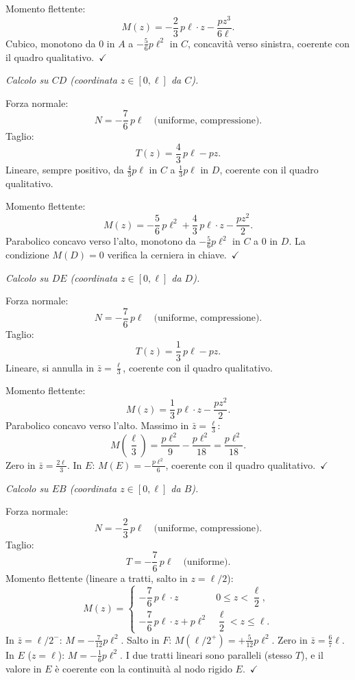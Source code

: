 \noindent Momento flettente:
\[
M(z) = -\frac{2}{3}\,p\ell\cdot z - \frac{pz^3}{6\ell}.
\]
Cubico, monotono da $0$ in $A$ a $-\tfrac{5}{6}p\ell^2$
in $C$, concavità verso sinistra, coerente con il quadro qualitativo.~$\checkmark$

\medskip
\noindent\textit{Calcolo su $CD$
(coordinata $z \in [0,\ell]$ da $C$).}

\noindent Forza normale:
\[
N = -\frac{7}{6}\,p\ell
\quad\text{(uniforme, compressione).}
\]
Taglio:
\[
T(z) = \frac{4}{3}\,p\ell - pz.
\]
Lineare, sempre positivo, da $\tfrac{4}{3}p\ell$
in $C$ a $\tfrac{1}{3}p\ell$ in $D$,
coerente con il quadro qualitativo.

\noindent Momento flettente:
\[
M(z) = -\frac{5}{6}\,p\ell^2
+ \frac{4}{3}\,p\ell\cdot z - \frac{pz^2}{2}.
\]
Parabolico concavo verso l'alto, monotono da
$-\tfrac{5}{6}p\ell^2$ in $C$ a $0$ in $D$.
La condizione $M(D)=0$ verifica la cerniera
in chiave.~$\checkmark$

\medskip
\noindent\textit{Calcolo su $DE$
(coordinata $z \in [0,\ell]$ da $D$).}

\noindent Forza normale:
\[
N = -\frac{7}{6}\,p\ell
\quad\text{(uniforme, compressione).}
\]
Taglio:
\[
T(z) = \frac{1}{3}\,p\ell - pz.
\]
Lineare, si annulla in $\bar{z} = \tfrac{\ell}{3}$,
coerente con il quadro qualitativo.

\noindent Momento flettente:
\[
M(z) = \frac{1}{3}\,p\ell\cdot z - \frac{pz^2}{2}.
\]
Parabolico concavo verso l'alto.
Massimo in $\bar{z} = \tfrac{\ell}{3}$:
\[
M\!\left(\frac{\ell}{3}\right)
= \frac{p\ell^2}{9} - \frac{p\ell^2}{18}
= \frac{p\ell^2}{18}.
\]
Zero in $\bar{z} = \tfrac{2\ell}{3}$.
In $E$: $M(E) = -\tfrac{p\ell^2}{6}$,
coerente con il quadro qualitativo.~$\checkmark$

\medskip
\noindent\textit{Calcolo su $EB$
(coordinata $z \in [0,\ell]$ da $B$).}

\noindent Forza normale:
\[
N = -\frac{2}{3}\,p\ell
\quad\text{(uniforme, compressione).}
\]
Taglio:
\[
T = -\frac{7}{6}\,p\ell
\quad\text{(uniforme).}
\]
Momento flettente (lineare a tratti, salto in
$z = \ell/2$):
\[
M(z) = \begin{cases}
-\dfrac{7}{6}\,p\ell\cdot z
& 0 \le z < \dfrac{\ell}{2},\\[10pt]
-\dfrac{7}{6}\,p\ell\cdot z + p\ell^2
& \dfrac{\ell}{2} < z \le \ell.
\end{cases}
\]
In $\bar{z} = \ell/2^-$:
$M = -\tfrac{7}{12}p\ell^2$.
Salto in $F$: $M(\ell/2^+) = +\tfrac{5}{12}p\ell^2$.
Zero in $\bar{z} = \tfrac{6}{7}\ell$.
In $E$ ($z=\ell$): $M = -\tfrac{1}{6}p\ell^2$.
I due tratti lineari sono paralleli (stesso $T$),
e il valore in $E$ è coerente con la continuità
al nodo rigido $E$.~$\checkmark$

